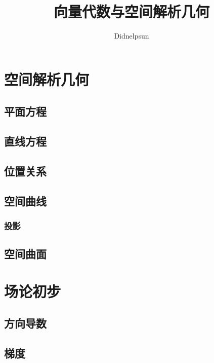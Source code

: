 \documentclass[UTF8, 12pt]{ctexart}
\author{Didnelpsun}
\title{向量代数与空间解析几何}
\date{}
\begin{document}
\maketitle
\pagestyle{empty}
\thispagestyle{empty}
\tableofcontents
\thispagestyle{empty}
\newpage
\pagestyle{plain}
\setcounter{page}{1}

\section{空间解析几何}

\subsection{平面方程}

\subsection{直线方程}

\subsection{位置关系}

\subsection{空间曲线}

\subsubsection{投影}

\subsection{空间曲面}

\section{场论初步}

\subsection{方向导数}

\subsection{梯度}
\end{document}
